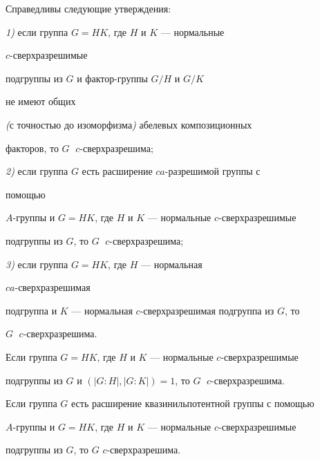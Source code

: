 \begin{thm}


Справедливы следующие утверждения:





{\em 1)} если группа $G=HK$, где $H$ и $K$ --- нормальные


$c$-сверхразрешимые


подгруппы из $G$ и фактор-группы $G/H$ и $G/K$


не имеют общих


{\em (}с точностью до изоморфизма{\em )} абелевых композиционных


факторов, то $G\;$ $c$-сверхразрешима;





{\em 2)} если группа $G$ есть расширение $ca$-разрешимой группы с


помощью


$A$-группы и $G=HK$, где $H$ и $K$ --- нормальные $c$-сверхразрешимые


подгруппы из $G$, то $G\;$ $c$-сверхразрешима;





{\em 3)} если группа $G=HK$, где $H$ --- нормальная


$ca$-сверхразрешимая


подгруппа и $K$ --- нормальная $c$-сверхразрешимая подгруппа из $G$, то


$G\;$ $c$-сверхразрешима.


\end{thm}





\begin{cor}


Если группа $G=HK$, где $H$ и $K$ --- нормальные $c$-сверхразрешимые


подгруппы из $G$ и $(|G{:}H|,|G{:}K|)=1$, то $G\;$ $c$-сверхразрешима.


\end{cor}





\begin{cor}


Если группа $G$ есть расширение квазинильпотентной группы с помощью


$A$-группы и $G=HK$, где $H$ и $K$ --- нормальные $c$-сверхразрешимые


подгруппы из $G$, то $G$ $c$-сверхразрешима.


\end{cor}





